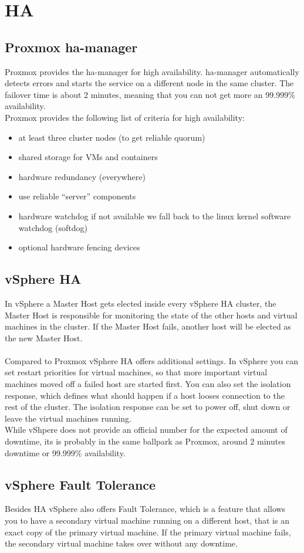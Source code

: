 \section{HA}

\subsection{Proxmox ha-manager}
Proxmox provides the ha-manager for high availability. ha-manager automatically detects errors and starts the service on a different node in the same cluster. The failover time is about 2 minutes, meaning that you can not get more an 99.999\% availability.
\\
Proxmox provides the following list of criteria for high availability:

\begin{itemize}
    \item at least three cluster nodes (to get reliable quorum)
    \item shared storage for VMs and containers
    \item hardware redundancy (everywhere)
    \item use reliable “server” components
    \item hardware watchdog \- if not available we fall back to the linux kernel software watchdog (softdog)
    \item optional hardware fencing devices
\end{itemize}

\subsection{vSphere HA}
In vSphere a Master Host gets elected inside every vSphere HA cluster, the Master Host is responsible for monitoring the state of the other hosts and virtual machines in the cluster. If the Master Host fails, another host will be elected as the new Master Host.
\\\\
Compared to Proxmox vSphere HA offers additional settings. In vSphere you can set restart priorities for virtual machines, so that more important virtual machines moved off a failed host are started first. You can also set the isolation response, which defines what should happen if a host looses connection to the rest of the cluster. The isolation response can be set to power off, shut down or leave the virtual machines running.
\\
While vShpere does not provide an official number for the expected amount of downtime, its is probably in the same ballpark as Proxmox, around 2 minutes downtime or 99.999\% availability.

\subsection{vSphere Fault Tolerance}

Besides HA vSphere also offers Fault Tolerance, which is a feature that allows you to have a secondary virtual machine running on a different host, that is an exact copy of the primary virtual machine. If the primary virtual machine fails, the secondary virtual machine takes over without any downtime. 